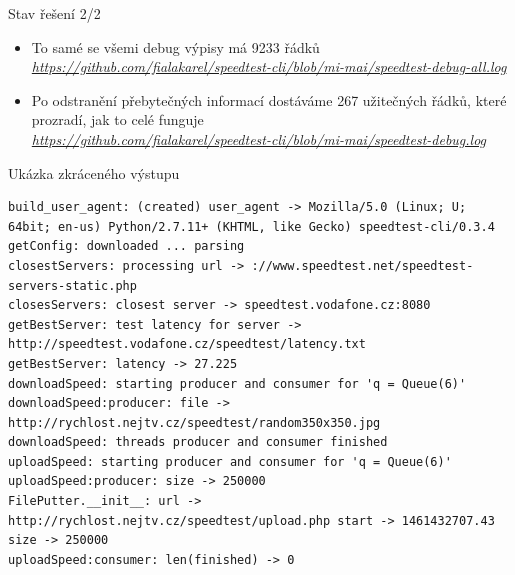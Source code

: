 \documentclass{beamer}
\begin{document}
\begin{frame}{Stav řešení 2/2}
\begin{itemize}
\item To samé se všemi debug výpisy má 9233 řádků \\
	\textit{\url{https://github.com/fialakarel/speedtest-cli/blob/mi-mai/speedtest-debug-all.log}}
\bigskip
\item Po odstranění přebytečných informací dostáváme 267 užitečných řádků,
	které prozradí, jak to celé funguje\\
	\textit{\url{https://github.com/fialakarel/speedtest-cli/blob/mi-mai/speedtest-debug.log}}
\end{itemize}

\end{frame}



\begin{frame}[fragile]{Ukázka zkráceného výstupu}
\begin{verbatim}
build_user_agent: (created) user_agent -> Mozilla/5.0 (Linux; U; 64bit; en-us) Python/2.7.11+ (KHTML, like Gecko) speedtest-cli/0.3.4
getConfig: downloaded ... parsing
closestServers: processing url -> ://www.speedtest.net/speedtest-servers-static.php
closesServers: closest server -> speedtest.vodafone.cz:8080
getBestServer: test latency for server -> http://speedtest.vodafone.cz/speedtest/latency.txt
getBestServer: latency -> 27.225
downloadSpeed: starting producer and consumer for 'q = Queue(6)'
downloadSpeed:producer: file -> http://rychlost.nejtv.cz/speedtest/random350x350.jpg
downloadSpeed: threads producer and consumer finished
uploadSpeed: starting producer and consumer for 'q = Queue(6)'
uploadSpeed:producer: size -> 250000
FilePutter.__init__: url -> http://rychlost.nejtv.cz/speedtest/upload.php start -> 1461432707.43 size -> 250000
uploadSpeed:consumer: len(finished) -> 0
\end{verbatim}
\end{frame}
\end{document}
